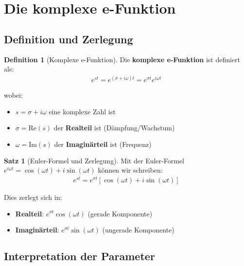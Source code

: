 ﻿\documentclass[a4paper,12pt]{report}
\theoremstyle{definition}
\newtheorem{definition}{Definition}
\newtheorem{satz}{Satz}
\begin{document}
	\section{Die komplexe e-Funktion}
	
	\subsection{Definition und Zerlegung}
	
	\begin{definition}[Komplexe e-Funktion]
		Die \textbf{komplexe e-Funktion} ist definiert als:
		\begin{align}
			e^{st} = e^{(\sigma + i\omega)t} = e^{\sigma t} e^{i\omega t}
		\end{align}
		
		wobei:
		\begin{itemize}
			\item[-] $s = \sigma + i\omega$ eine komplexe Zahl ist
			\item[-] $\sigma = \text{Re}(s)$ der \textbf{Realteil} ist (Dämpfung/Wachstum)
			\item[-] $\omega = \text{Im}(s)$ der \textbf{Imaginärteil} ist (Frequenz)
		\end{itemize}
	\end{definition}
	
	\begin{satz}[Euler-Formel und Zerlegung]
		Mit der Euler-Formel $e^{i\omega t} = \cos(\omega t) + i\sin(\omega t)$ können wir schreiben:
		\begin{align}
			e^{st} = e^{\sigma t} [\cos(\omega t) + i\sin(\omega t)]
		\end{align}
		
		Dies zerlegt sich in:
		\begin{itemize}
			\item[-] \textbf{Realteil}: $e^{\sigma t} \cos(\omega t)$ (gerade Komponente)
			\item[-] \textbf{Imaginärteil}: $e^{\sigma t} \sin(\omega t)$ (ungerade Komponente)
		\end{itemize}
	\end{satz}
	
	\subsection{Interpretation der Parameter}
	
\end{document}
